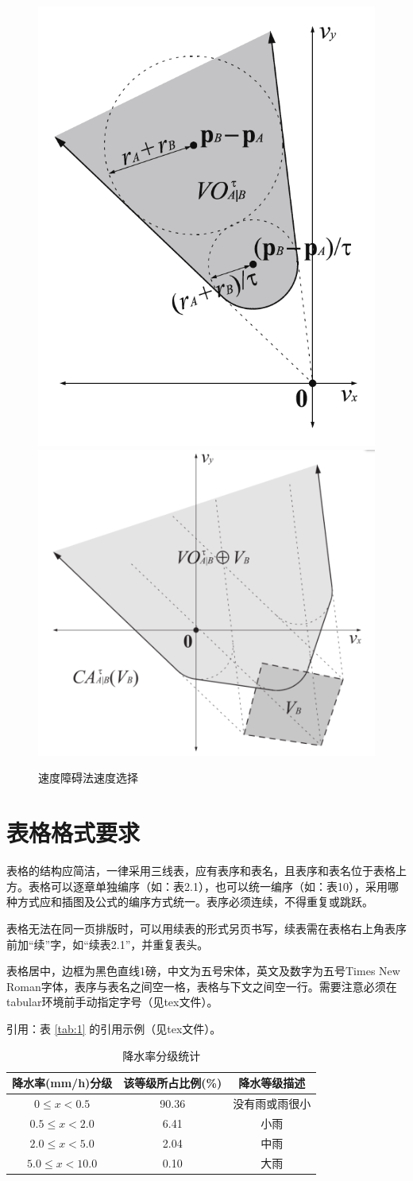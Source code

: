 \documentclass{seuthesis-2022}
\numberwithin{equation}{section}
\begin{document}
\begin{figure}[H]
    \centering
      {\includegraphics[width=0.3\linewidth]{fig/速度障碍集合.png}}
      {\includegraphics[width=0.4\linewidth]{fig/避免碰撞集合.png}}
    \caption{速度障碍法速度选择}
    \label{fig:200}
\end{figure}

\section{表格格式要求}
表格的结构应简洁，一律采用三线表，应有表序和表名，且表序和表名位于表格上方。表格可以逐章单独编序（如：表2.1），也可以统一编序（如：表10），采用哪种方式应和插图及公式的编序方式统一。表序必须连续，不得重复或跳跃。

表格无法在同一页排版时，可以用续表的形式另页书写，续表需在表格右上角表序前加“续”字，如“续表2.1”，并重复表头。

表格居中，边框为黑色直线1磅，中文为五号宋体，英文及数字为五号Times New Roman字体，表序与表名之间空一格，表格与下文之间空一行。需要注意必须在tabular环境前手动指定字号（见tex文件）。

引用：表 \ref{tab:1} 的引用示例（见tex文件）。

\begin{table}[H]
  \centering
  \caption{降水率分级统计}
  \label{tab:100}
  \small
  \begin{tabular}{ccc}
    \toprule
    降水率(mm/h)分级 & 该等级所占比例(\%) & 降水等级描述\\
    \midrule
    $0\le x< 0.5$ & 90.36 & 没有雨或雨很小\\
    $0.5\le x< 2.0$ & 6.41 & 小雨\\
    $2.0\le x< 5.0$ & 2.04 & 中雨\\
    $5.0\le x< 10.0$ & 0.10 & 大雨\\
    \bottomrule
  \end{tabular}
\end{table}
\end{document}

